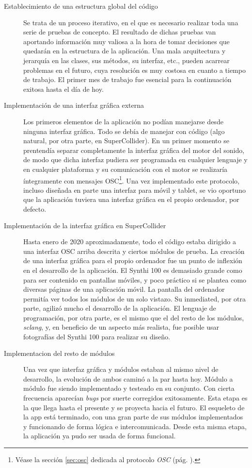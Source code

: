 \begin{description} 
	\item[Establecimiento de una estructura global del código] Se trata de un proceso iterativo, en el que es necesario realizar toda una serie de pruebas de concepto. El resultado de dichas pruebas van aportando información muy valiosa a la hora de tomar decisiones que quedarán en la estructura de la aplicación. Una mala arquitectura y jerarquía en las clases, sus métodos, su interfaz, etc., pueden acarrear problemas en el futuro, cuya resolución es muy costosa en cuanto a tiempo de trabajo. El primer mes de trabajo fue esencial para la continuación exitosa hasta el día de hoy.
	
	\item[Implementación de una interfaz gráfica externa] Los primeros elementos de la aplicación no podían manejarse desde ninguna interfaz gráfica. Todo se debía de manejar con código (algo natural, por otra parte, en SuperCollider). En un primer momento se prentendía separar completamente la interfaz gráfica del motor del sonido, de modo que dicha interfaz pudiera ser programada en cualquier lenguaje y en cualquier plataforma y su comunicación con el motor se realizaría íntegramente con mensajes OSC\footnote{Véase la sección \ref{sec:osc} dedicada al protocolo \textit{OSC} (pág. \pageref{sec:osc}).}. Una vez implementado este protocolo, incluso diseñada en parte una interfaz para móvil y tablet, se vio oportuno que la aplicación tuviera una interfaz gráfica en el propio ordenador, por defecto.
	
	\item[Implementación de la interfaz gráfica en SuperCollider] Hasta enero de 2020 aproximadamente, todo el código estaba dirigido a una interfaz OSC arriba descrita y ciertos módulos de prueba. La creación de una interfaz gráfica para el propio ordenador fue un punto de inflexión en el desarrollo de la aplicación. El Synthi 100 es demasiado grande como para ser contenido en pantallas móviles, y poco práctico si se plantea como diversas páginas de una aplicación móvil. La pantalla del ordenador permitía ver todos los módulos de un solo vistazo. Su inmediated, por otra parte, agilizó mucho el desarrollo de la aplicación. El lenguaje de programación, por otra parte, es el mismo que el del resto de los módulos, \textit{sclang}, y, en beneficio de un aspecto más realista, fue posible usar fotografías del Synthi 100 para realizar su diseño.
	
	\item[Implementacion del resto de módulos] Una vez que interfaz gráfica y módulos estaban al mismo nivel de desarrollo, la evolución de ambos caminó a la par hasta hoy. Módulo a módulo fue siendo implementado y testeado en su conjunto. Con cierta frecuencia aparecían \textit{bugs} por suerte corregidos exitosamente. Esta etapa es la que llega hasta el presente y se proyecta hacia el futuro. El esqueleto de la app está terminado, con una gran parte de sus módulos implementados y funcionando de forma lógica e intercomunicada. Desde esta misma etapa, la aplicación ya pudo ser usada de forma funcional.
\end{description}




